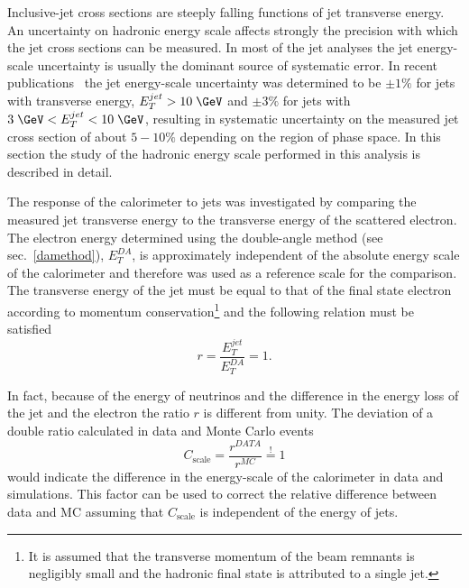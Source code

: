 Inclusive-jet cross sections are steeply falling functions of jet transverse energy. An uncertainty on hadronic energy scale affects strongly the precision with which the jet cross sections can be measured. In most of the jet analyses the jet energy-scale uncertainty is usually the dominant source of systematic error. In recent \zeus publications~\cite{epj:c70:965, np:b864:1} the jet energy-scale uncertainty was determined to be $\pm 1\%$ for jets with transverse energy, $\etjet>10\; \GeV$ and $\pm 3\%$ for jets with $3\; \GeV<\etjet < 10\; \GeV$, resulting in systematic uncertainty on the measured jet cross section of about $5-10\%$ depending on the region of phase space. In this section the study of the hadronic energy scale performed in this analysis is described in detail.

The response of the calorimeter to jets was investigated by comparing the measured jet transverse energy to the transverse energy of the scattered electron. The electron energy determined using the double-angle method (see sec.~\ref{damethod}), $E_T^{DA}$, is approximately independent of the absolute energy scale of the calorimeter and therefore was used as a reference scale for the comparison. The transverse energy of the jet must be equal to that of the final state electron according to momentum conservation\footnote{It is assumed that the transverse momentum of the beam remnants is negligibly small and the hadronic final state is attributed to a single jet.} and the following relation must be satisfied
\begin{equation}
r = \frac{E_T^{jet}}{E_T^{DA}} = 1.
\label{eq:etjetetelbalance}
\end{equation}

In fact, because of the energy of neutrinos and the difference in the energy loss of the jet and the electron the ratio $r$ is different from unity. The deviation of a double ratio calculated in data and Monte Carlo events
\begin{equation}
C_\text{scale} = \frac{r^{DATA}}{r^{MC}} \stackrel{!}{=} 1
\label{eq:cscale}
\end{equation}
would indicate the difference in the energy-scale of the calorimeter in data and simulations. This factor can be used to correct the relative difference between data and MC assuming that $C_\text{scale}$ is independent of the energy of jets. 


